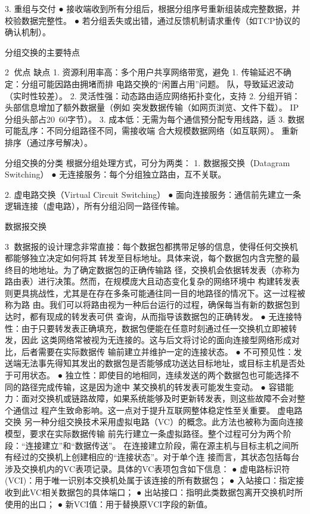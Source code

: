 3. 重组与交付
   ● 接收端收到所有分组后，根据分组序号重新组装成完整数据，并校验数据完整性。
   ● 若分组丢失或出错，通过反馈机制请求重传（如TCP协议的确认机制）。


分组交换的主要特点

                                                        2
优点                        缺点
1. 资源利用率高：多个用户共享网络带宽，避免   1. 传输延迟不确定：分组可能因路由拥堵而排
电路交换的“闲置占用”问题。            队，导致延迟波动（实时性较差）。
2. 灵活性强：动态路由适应网络拓扑变化，支持   2. 分组开销：头部信息增加了额外数据量（例如
突发数据传输（如网页浏览、文件下载）。       IP分组头部占20~60字节）。
3. 成本低：无需为每个通信预分配专用线路，适   3. 数据可能乱序：不同分组路径不同，需接收端
合大规模数据网络（如互联网）。           重新排序（通过序号解决）。

分组交换的分类
根据分组处理方式，可分为两类：
1. 数据报交换（Datagram Switching）
  ● 无连接服务：每个分组独立路由，互不关联。

2. 虚电路交换（Virtual Circuit Switching）
  ● 面向连接服务：通信前先建立一条逻辑连接（虚电路），所有分组沿同一路径传输。




数据报交换

                                                    3
数据报的设计理念非常直接：每个数据包都携带足够的信息，使得任何交换机都能够独立决定如何将其
转发至目标地址。具体来说，每个数据包内含完整的最终目的地地址。为了确定数据包的正确传输路
径，交换机会依据转发表（亦称为路由表）进行决策。然而，在规模庞大且动态变化复杂的网络环境中
构建转发表则更具挑战性，尤其是在存在多条可能通往同一目的地路径的情况下。这一过程被称为路
由。我们可以将路由视为一种后台运行的过程，确保每当有新的数据包到达时，都有现成的转发表可供
查询，从而指导该数据包的正确转发。
 ● 无连接特性：由于只要转发表正确填充，数据包便能在任意时刻通过任一交换机立即被转发，因此
   这类网络常被视为无连接的。这与后文将讨论的面向连接型网络形成对比，后者需要在实际数据传
   输前建立并维护一定的连接状态。
 ● 不可预见性：发送端无法事先得知其发出的数据包是否能够成功送达目标地址，或目标主机是否处
   于可用状态。
 ● 独立性：即使目的地相同，连续发送的两个数据包也可能选择不同的路径完成传输，这是因为途中
   某交换机的转发表可能发生变动。
 ● 容错能力：面对交换机或链路故障，如果系统能够及时更新转发表，则这些故障不会对整个通信过
   程产生致命影响。这一点对于提升互联网整体稳定性至关重要。
虚电路交换
另一种分组交换技术采用虚拟电路（VC）的概念。此方法也被称为面向连接模型，要求在实际数据传输
前先行建立一条虚拟路径。整个过程可分为两个阶段：“连接建立”和“数据传送”。
在连接建立阶段，需在源主机与目标主机之间所有经过的交换机上创建相应的“连接状态”。对于单个连
接而言，其状态包括每台涉及交换机内的VC表项记录。具体的VC表项包含如下信息：
  ● 虚电路标识符(VCI)：用于唯一识别本交换机处属于该连接的所有数据包；
  ● 入站接口：指定接收到此VC相关数据包的具体端口；
  ● 出站接口：指明此类数据包离开交换机时所使用的出口；
  ● 新VCI值：用于替换原VCI字段的新值。


